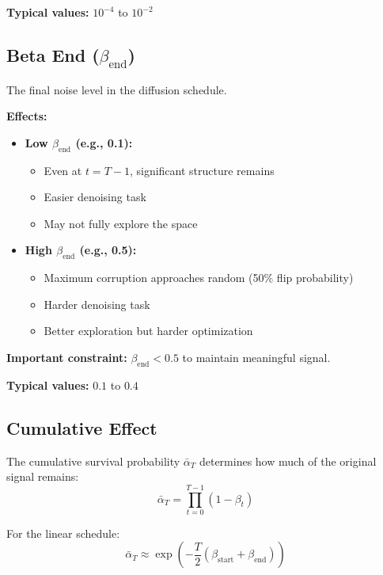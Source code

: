 \documentclass[11pt,a4paper]{article}
\begin{document}
\textbf{Typical values:} $10^{-4}$ to $10^{-2}$

\subsection{Beta End ($\beta_{\text{end}}$)}

The final noise level in the diffusion schedule.

\textbf{Effects:}
\begin{itemize}
    \item \textbf{Low $\beta_{\text{end}}$ (e.g., 0.1):}
        \begin{itemize}
            \item Even at $t=T-1$, significant structure remains
            \item Easier denoising task
            \item May not fully explore the space
        \end{itemize}
    \item \textbf{High $\beta_{\text{end}}$ (e.g., 0.5):}
        \begin{itemize}
            \item Maximum corruption approaches random (50\% flip probability)
            \item Harder denoising task
            \item Better exploration but harder optimization
        \end{itemize}
\end{itemize}

\textbf{Important constraint:} $\beta_{\text{end}} < 0.5$ to maintain meaningful signal.

\textbf{Typical values:} $0.1$ to $0.4$

\subsection{Cumulative Effect}

The cumulative survival probability $\bar{\alpha}_T$ determines how much of the original signal remains:
\begin{equation}
    \bar{\alpha}_T = \prod_{t=0}^{T-1}(1 - \beta_t)
\end{equation}

For the linear schedule:
\begin{equation}
    \bar{\alpha}_T \approx \exp\left(-\frac{T}{2}(\beta_{\text{start}} + \beta_{\text{end}})\right)
\end{equation}
\end{document}
